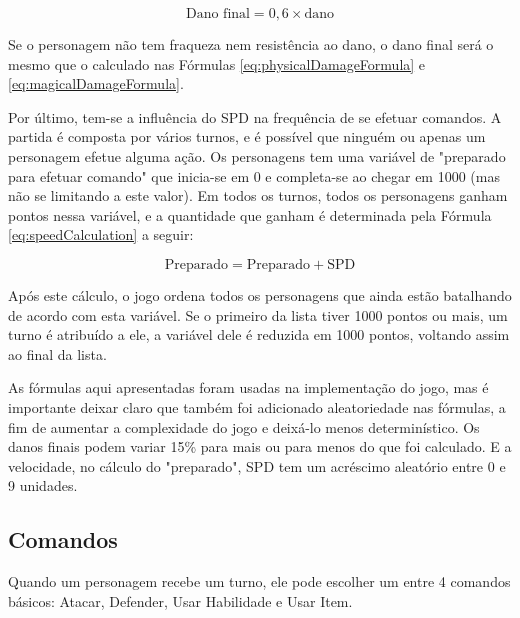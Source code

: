 \documentclass[
	12pt,					%
	openright,				%
	oneside,				%
	a4paper,				%
	bibjustif,				%
	chapter=TITLE,			%
	english,				%
	brazil,					%
	]{abntex2}
\begin{document}
	\begin{equation}
		\textrm{Dano final} = 0,6 \times \textrm{dano}
		\label{eq:damageReduction}
	\end{equation}
	
	\vspace{3mm}
	
	Se o personagem não tem fraqueza nem resistência ao dano,
	o dano final será o mesmo que o calculado nas Fórmulas \eqref{eq:physicalDamageFormula} e \eqref{eq:magicalDamageFormula}.
	
	Por último, tem-se a influência do SPD na frequência de se efetuar comandos.
	A partida é composta por vários turnos,
	e é possível que ninguém ou apenas um personagem efetue alguma ação.
	Os personagens tem uma variável de "preparado para efetuar comando"{} que inicia-se em 0 e completa-se ao chegar em 1000
	(mas não se limitando a este valor).
	Em todos os turnos, todos os personagens ganham pontos nessa variável,
	e a quantidade que ganham é determinada pela Fórmula \eqref{eq:speedCalculation} a seguir:
	
	\begin{equation}
		\textrm{Preparado} = \textrm{Preparado} + \textrm{SPD}
		\label{eq:speedCalculation}
	\end{equation}
	
	\vspace{3mm}
	
	Após este cálculo,
	o jogo ordena todos os personagens que ainda estão batalhando de acordo com esta variável.
	Se o primeiro da lista tiver 1000 pontos ou mais, um turno é atribuído a ele,
	a variável dele é reduzida em 1000 pontos,
	voltando assim ao final da lista.
	
	As fórmulas aqui apresentadas foram usadas na implementação do jogo,
	mas é importante deixar claro que também foi adicionado aleatoriedade nas fórmulas,
	a fim de aumentar a complexidade do jogo e deixá-lo menos determinístico.
	Os danos finais podem variar 15\% para mais ou para menos do que foi calculado.
	E a velocidade, no cálculo do "preparado"{}, SPD tem um acréscimo aleatório entre 0 e 9 unidades.
	
	\subsection{Comandos}
	Quando um personagem recebe um turno,
	ele pode escolher um entre 4 comandos básicos:
	Atacar, Defender, Usar Habilidade e Usar Item.
	
\end{document}
